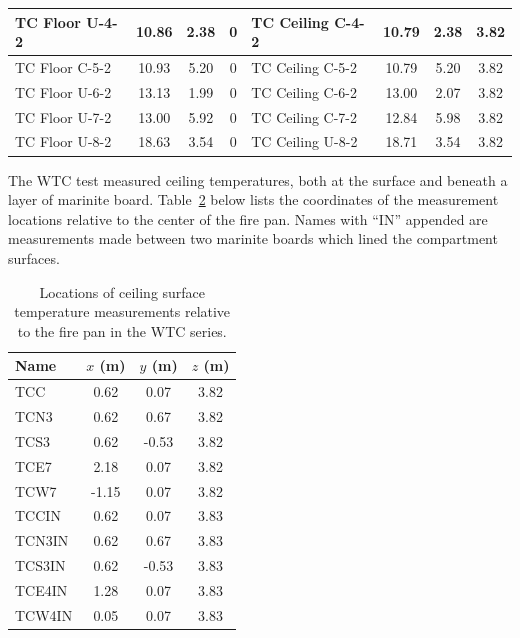 \begin{table}[p]
\begin{center}
\begin{tabular}{|l|c|c|c||l|c|c|c|}
TC Floor U-4-2    & 10.86 & 2.38 & 0        & TC Ceiling C-4-2  & 10.79 & 2.38  & 3.82      \\ \hline
TC Floor C-5-2    & 10.93 & 5.20 & 0        & TC Ceiling C-5-2  & 10.79 & 5.20  & 3.82      \\ \hline
TC Floor U-6-2    & 13.13 & 1.99 & 0        & TC Ceiling C-6-2  & 13.00 & 2.07  & 3.82      \\ \hline
TC Floor U-7-2    & 13.00 & 5.92 & 0        & TC Ceiling C-7-2  & 12.84 & 5.98  & 3.82      \\ \hline
TC Floor U-8-2    & 18.63 & 3.54 & 0        & TC Ceiling U-8-2  & 18.71 & 3.54  & 3.82      \\ \hline
\end{tabular}
\end{center}
\label{NIST_NRC_Wall_Coords}
\end{table}

The WTC test measured ceiling temperatures, both at the surface and beneath a layer of marinite board. Table~\ref{WTC_Ceiling_Coords} below lists the coordinates of the measurement locations relative to the center of the fire pan. Names with ``IN'' appended are measurements made between two marinite boards which lined the compartment surfaces.

\begin{table}[h!]
\caption[Ceiling surface measurement locations for the WTC series]{Locations of ceiling surface temperature measurements relative to the fire pan in the WTC series.}
\begin{center}
\begin{tabular}{|l|c|c|c|}
\hline
Name                & $x$ (m)   & $y$ (m)   & $z$ (m)   \\ \hline \hline
TCC                 & 0.62      & 0.07      & 3.82      \\ \hline
TCN3                & 0.62      & 0.67      & 3.82      \\ \hline
TCS3                & 0.62      & -0.53     & 3.82      \\ \hline
TCE7                & 2.18      & 0.07      & 3.82      \\ \hline
TCW7                & -1.15     & 0.07      & 3.82      \\ \hline \hline
TCCIN               & 0.62      & 0.07      & 3.83      \\ \hline
TCN3IN              & 0.62      & 0.67      & 3.83      \\ \hline
TCS3IN              & 0.62      & -0.53     & 3.83      \\ \hline
TCE4IN              & 1.28      & 0.07      & 3.83      \\ \hline
TCW4IN              & 0.05      & 0.07      & 3.83      \\ \hline
\end{tabular}
\end{center}
\label{WTC_Ceiling_Coords}
\end{table}


